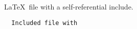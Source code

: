 \LaTeX\ file with a self-referential include.
\begin{verbatim}
  Included file with 
\end{verbatim}
